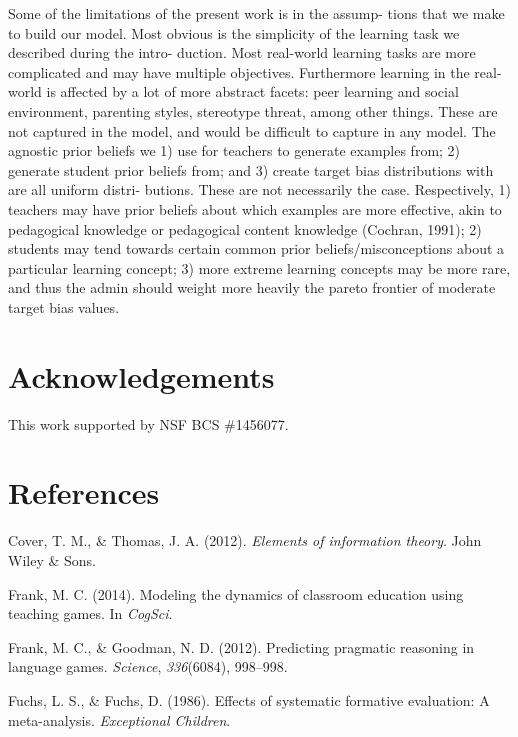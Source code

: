 \documentclass[10pt, letterpaper]{article}
\begin{document}
Some of the limitations of the present work is in the assump- tions that
we make to build our model. Most obvious is the simplicity of the
learning task we described during the intro- duction. Most real-world
learning tasks are more complicated and may have multiple objectives.
Furthermore learning in the real-world is affected by a lot of more
abstract facets: peer learning and social environment, parenting styles,
stereotype threat, among other things. These are not captured in the
model, and would be difficult to capture in any model. The agnostic
prior beliefs we 1) use for teachers to generate examples from; 2)
generate student prior beliefs from; and 3) create target bias
distributions with are all uniform distri- butions. These are not
necessarily the case. Respectively, 1) teachers may have prior beliefs
about which examples are more effective, akin to pedagogical knowledge
or pedagogical content knowledge (Cochran, 1991); 2) students may tend
towards certain common prior beliefs/misconceptions about a particular
learning concept; 3) more extreme learning concepts may be more rare,
and thus the admin should weight more heavily the pareto frontier of
moderate target bias values.

\section{Acknowledgements}\label{acknowledgements}

This work supported by NSF BCS \#1456077.

\section{References}\label{references}

\setlength{\parindent}{-0.1in} \setlength{\leftskip}{0.125in} \noindent

\hypertarget{refs}{}
\hypertarget{ref-cover2012}{}
Cover, T. M., \& Thomas, J. A. (2012). \emph{Elements of information
theory}. John Wiley \& Sons.

\hypertarget{ref-frank2014}{}
Frank, M. C. (2014). Modeling the dynamics of classroom education using
teaching games. In \emph{CogSci}.

\hypertarget{ref-frank2012}{}
Frank, M. C., \& Goodman, N. D. (2012). Predicting pragmatic reasoning
in language games. \emph{Science}, \emph{336}(6084), 998--998.

\hypertarget{ref-fuchs1986}{}
Fuchs, L. S., \& Fuchs, D. (1986). Effects of systematic formative
evaluation: A meta-analysis. \emph{Exceptional Children}.
\end{document}
